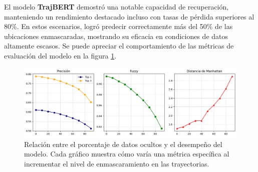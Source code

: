El modelo \textbf{TrajBERT} demostró una notable capacidad de recuperación, manteniendo un rendimiento destacado incluso con tasas de pérdida superiores al 80\%. En estos escenarios, logró predecir correctamente más del 50\% de las ubicaciones enmascaradas, mostrando su eficacia en condiciones de datos altamente escasos. Se puede apreciar el comportamiento de las métricas de evaluación del modelo en la figura \ref{fig:humob_percent_variability_analisys}.

\begin{figure}[!htb] \includegraphics[width=1\textwidth]{Graphics/humob_percent_variability_analisys.png} \caption{Relación entre el porcentaje de datos ocultos y el desempeño del modelo. Cada gráfico muestra cómo varía una métrica específica al incrementar el nivel de enmascaramiento en las trayectorias.} \label{fig:humob_percent_variability_analisys} 
\end{figure}

